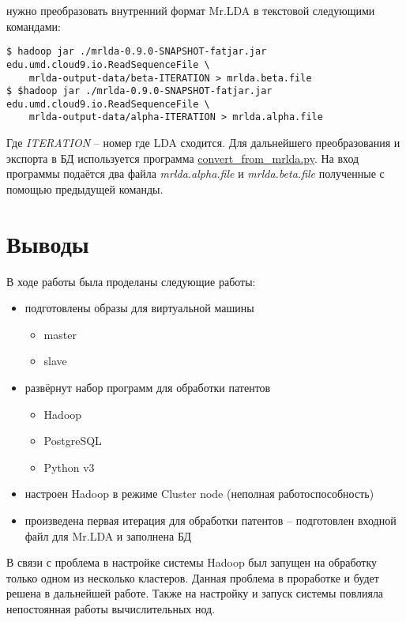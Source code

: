 нужно преобразовать внутренний формат Mr.LDA в текстовой следующими командами:
\begin{lstlisting}
$ hadoop jar ./mrlda-0.9.0-SNAPSHOT-fatjar.jar edu.umd.cloud9.io.ReadSequenceFile \
    mrlda-output-data/beta-ITERATION > mrlda.beta.file
$ $hadoop jar ./mrlda-0.9.0-SNAPSHOT-fatjar.jar edu.umd.cloud9.io.ReadSequenceFile \
    mrlda-output-data/alpha-ITERATION > mrlda.alpha.file
\end{lstlisting}
Где \emph{ITERATION} -- номер где LDA сходится. Для дальнейшего преобразования и экспорта в БД используется 
программа 
\href{https://github.com/SemPatent/Golubev/blob/master/convert_from_mrlda.py}{convert\_from\_mrlda.py}. На 
вход программы подаётся два файла \emph{mrlda.alpha.file} и \emph{mrlda.beta.file} полученные с помощью 
предыдущей команды.

\newpage

\section{Выводы}
В ходе работы была проделаны следующие работы:
\begin{itemize}
    \item подготовлены образы для виртуальной машины
    \begin{itemize}
        \item master
        \item slave
    \end{itemize}
    \item развёрнут набор программ для обработки патентов
    \begin{itemize}
        \item Hadoop
        \item PostgreSQL
        \item Python v3
    \end{itemize}
    \item настроен Hadoop в режиме Cluster node (неполная работоспособность)
    \item произведена первая итерация для обработки патентов -- подготовлен входной файл 
        для Mr.LDA и заполнена БД
\end{itemize}
В связи с проблема в настройке системы Hadoop был запущен на обработку только одном из несколько кластеров.
Данная проблема в проработке и будет решена в дальнейшей работе. Также на настройку и запуск системы 
повлияла непостоянная работы вычислительных нод.

